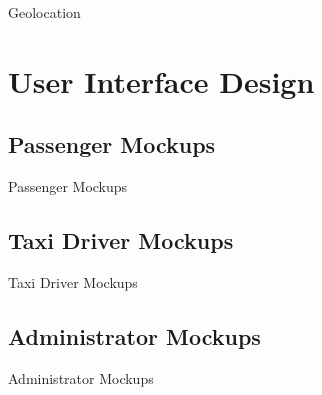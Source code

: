 \documentclass{../common/latex_classes/pdf_presentation}
\begin{document}
	\begin{frame}{Geolocation}
	\end{frame}
	
	\section{User Interface Design}
	
	\subsection{Passenger Mockups}
	
	\begin{frame}{Passenger Mockups}
	\end{frame}
	
	\subsection{Taxi Driver Mockups}
	
	\begin{frame}{Taxi Driver Mockups}
	\end{frame}
	
	\subsection{Administrator Mockups}
	
	\begin{frame}{Administrator Mockups}
	\end{frame}
	
\end{document}
